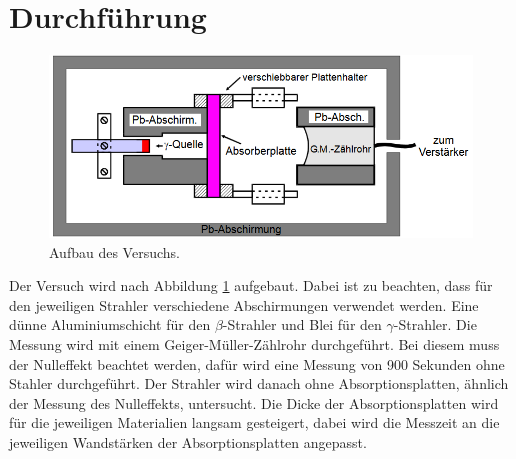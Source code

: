 \section{Durchführung}
\label{sec:Durchführung}
\begin{figure}[H]
    \centering
    \includegraphics[width=\textwidth]{content/Aufbau.png}
    \caption{Aufbau des Versuchs.}
    \label{fig:mess}
\end{figure}
\noindent
Der Versuch wird nach Abbildung \ref{fig:mess} aufgebaut.
Dabei ist zu beachten, dass für  den jeweiligen Strahler verschiedene Abschirmungen verwendet werden.
Eine dünne Aluminiumschicht für den $\beta$-Strahler und Blei für den $\gamma$-Strahler.
Die Messung wird mit einem Geiger-Müller-Zählrohr durchgeführt.
Bei diesem muss der Nulleffekt beachtet werden, dafür wird eine Messung von 900 Sekunden ohne Stahler durchgeführt.
Der Strahler wird danach ohne Absorptionsplatten, ähnlich der Messung des Nulleffekts, untersucht.
Die Dicke der Absorptionsplatten wird für die jeweiligen Materialien langsam gesteigert, dabei wird die Messzeit an die jeweiligen Wandstärken der Absorptionsplatten angepasst.
